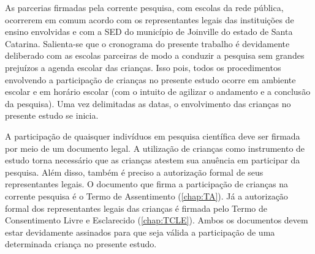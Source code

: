 As parcerias firmadas pela corrente pesquisa, com escolas da rede pública, ocorrerem em comum acordo com os representantes legais das instituições de ensino envolvidas e com a \ac{SED} do município de Joinville do estado de Santa Catarina. %
Salienta-se que o cronograma do presente trabalho é devidamente deliberado com as escolas parceiras de modo a conduzir a pesquisa sem grandes prejuízos a agenda escolar das crianças. Isso pois, todos os procedimentos envolvendo a participação de crianças no presente estudo ocorre em ambiente escolar e em horário escolar (com o intuito de agilizar o andamento e a conclusão da pesquisa). Uma vez delimitadas as datas, o envolvimento das crianças no presente estudo se inicia. 

A participação de quaisquer indivíduos em pesquisa científica deve ser firmada por meio de um documento legal. A utilização de crianças como instrumento de estudo torna necessário que as crianças atestem sua anuência em participar da pesquisa. Além disso, também é preciso a autorização formal de seus representantes legais. O documento que firma a participação de crianças na corrente pesquisa é o Termo de Assentimento (\autoref{chap:TA}). Já a autorização formal dos representantes legais das crianças é firmada pelo Termo de Consentimento Livre e Esclarecido (\autoref{chap:TCLE}). Ambos os documentos devem estar devidamente assinados para que seja válida a participação de uma determinada criança no presente estudo. %


